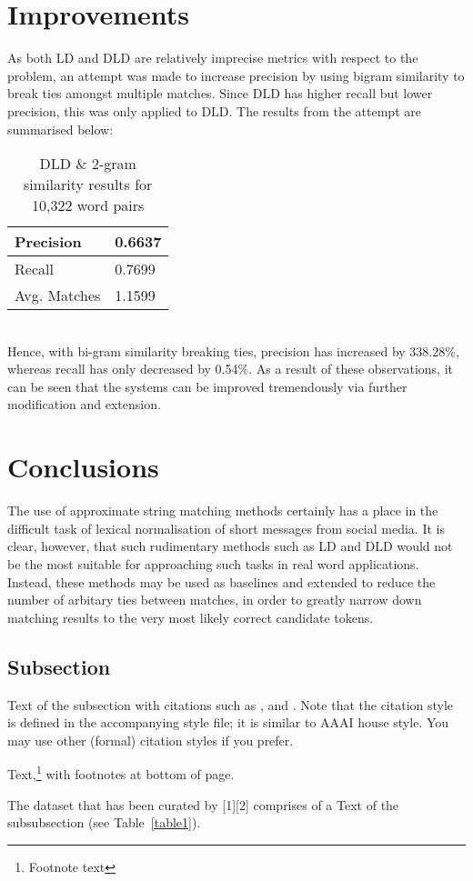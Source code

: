\documentclass[11pt]{article}
\begin{document}
\section{Improvements}
As both LD and DLD are relatively imprecise metrics with respect to the problem, an attempt was made to increase precision by using bigram similarity to break ties amongst multiple matches. Since DLD has higher recall but lower precision, this was only applied to DLD. The results from the attempt are summarised below:
\begin{table}[h]
\begin{center}
\begin{tabular}{|l|l|}
      \hline
      Precision & 0.6637\\
      \hline
      Recall & 0.7699\\
      \hline
      Avg. Matches & 1.1599\\
      \hline
\end{tabular}
\caption{DLD \& 2-gram similarity results for 10,322 word pairs}\label{table2}
\end{center}
\end{table}
\\
Hence, with bi-gram similarity breaking ties, precision has increased by 338.28\%, whereas recall has only decreased by 0.54\%. As a result of these observations, it can be seen that the systems can be improved tremendously via further modification and extension.



\section{Conclusions}
The use of approximate string matching methods certainly has a place in the difficult task of lexical normalisation of short messages from social media. It is clear, however, that such rudimentary methods such as LD and DLD would not be the most suitable for approaching such tasks in real word applications. Instead, these methods may be used as baselines and extended to reduce the number of arbitary ties between  matches, in order to greatly narrow down matching results to the very most likely correct candidate tokens. 



\subsection{Subsection}

Text of the subsection with citations such as 
,  and .
Note that the citation style is defined in the accompanying
style file; it is similar to AAAI house style. You may use
other (formal) citation styles if you prefer.


Text,\footnote{Footnote text} with footnotes at bottom of page.


The dataset that has been curated by [1][2] comprises of a 
Text of the subsubsection (see Table~\ref{table1}).






\end{document}
